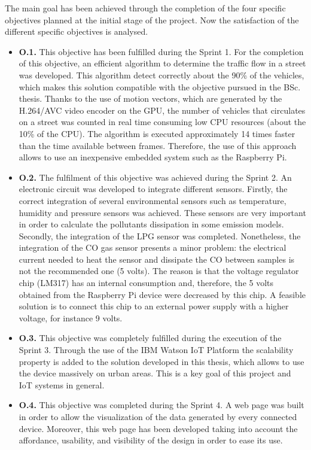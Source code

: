 The main goal has been achieved through the completion of the four specific objectives planned at the initial stage of the project. Now the satisfaction of the different specific objectives is analysed.
\begin{itemize}
	\item \textbf{O.1.} This objective has been fulfilled during the Sprint 1. For the completion of this objective, an efficient algorithm to determine the traffic flow in a street was developed. This algorithm detect correctly about the 90\% of the vehicles, which makes this solution compatible with the objective pursued in the \ac{BSc.} thesis. Thanks to the use of motion vectors, which are generated by the H.264/AVC video encoder on the \ac{GPU}, the number of vehicles that circulates on a street was counted in real time consuming low \ac{CPU} resources (about the 10\% of the \ac{CPU}). The algorithm is executed approximately 14 times faster than the time available between frames. Therefore, the use of this approach allows to use an inexpensive embedded system such as the Raspberry Pi.
	
	\item \textbf{O.2.} The fulfilment of this objective was achieved during the Sprint 2. An electronic circuit was developed to integrate different sensors. Firstly, the correct integration of several environmental sensors such as temperature, humidity and pressure sensors was achieved. These sensors are very important in order to calculate the pollutants dissipation in some emission models. Secondly, the integration of the LPG sensor was completed. Nonetheless, the integration of the CO gas sensor presents a minor problem: the electrical current needed to heat the sensor and dissipate the CO between samples is not the recommended one (5 volts). The reason is that the voltage regulator chip (LM317) has an internal consumption and, therefore, the 5 volts obtained from the Raspberry Pi device were decreased by this chip. A feasible solution is to connect this chip to an external power supply with a higher voltage, for instance 9 volts.
	
	\item \textbf{O.3.} This objective was completely fulfilled during the execution of the Sprint 3. Through the use of the IBM Watson IoT Platform the scalability property is added to the solution developed in this thesis, which allows to use the device massively on urban areas. This is a key goal of this project and \ac{IoT} systems in general.
	
	\item \textbf{O.4.} This objective was completed during the Sprint 4. A web page was built in order to allow the visualization of the data generated by every connected device. Moreover, this web page has been developed taking into account the affordance, usability, and visibility of the design in order to ease its use.
\end{itemize}


